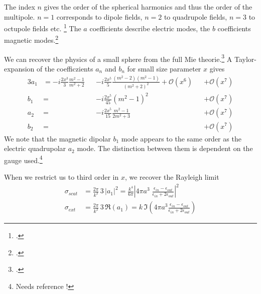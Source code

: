 The index $n$ gives the order of the spherical harmonics and thus the order of the multipole. $n=1$ corresponds to dipole fields, $n=2$ to quadrupole fields, $n=3$ to octupole fields etc. \footcite{KV-book} The $a$ coefficients describe electric modes, the $b$ coefficients magnetic modes.\footcite{KV-book, BH-book} 


We can recover the physics of a small sphere from the full Mie theorie.\footcite[chapter 5]{BH-book} A Taylor-expansion of the coefficzients $a_n$ and $b_n$ for small size parameter $x$ gives
\begin{alignat*}{3}
 a_1 &= -i \frac{2x^3}{3} \frac{m^2 -1}{m^2 + 2} && -i \frac{2x^5}{5} \frac{(m^2 -2)(m^2-1)}{(m^2 + 2)^2} + \mathcal{O}(x^6)  && + \mathcal{O}(x^7) \\
 b_1 &=  && -i \frac{2x^5}{45} (m^2 -1)^2  &&+ \mathcal{O}(x^7)  \\
 a_2 &=   &&-i \frac{2x^5}{15} \frac{m^2-1}{2 m^2 +3} &&+ \mathcal{O}(x^7)  \\
b_2 &= && &&+ \mathcal{O}(x^7)  
\end{alignat*}
We note that the magnetic dipolar $b_1$ mode appears to the same order as the electric quadrupolar $a_2$ mode. The distinction between them is dependent on the gauge used.\footnote{Needs reference !}

When we restrict us to third order in $x$, we recover the Rayleigh limit
\begin{eqnarray*}
\sigma_{scat} & = \frac{2 \pi }{k^2} \, 3 \, \left| a_1 \right|^2 
 = \frac{k^4}{6 \pi} \left| 4 \pi a^3  \; \frac{\epsilon_{in} - \epsilon_{out}}{\epsilon_{in} + 2 \epsilon_{out}} \right|^2 \\
\sigma_{ext} & = \frac{2 \pi }{k^2} \, 3 \, \Re \left( a_1 \right) 
= k \, \Im \left( 4 \pi a^3 \frac{\epsilon_{in} - \epsilon_{out}}{\epsilon_{in} + 2 \epsilon_{out}}  \right)
\end{eqnarray*}

\printbibliography[segment=\therefsegment,heading=subbibliography]
